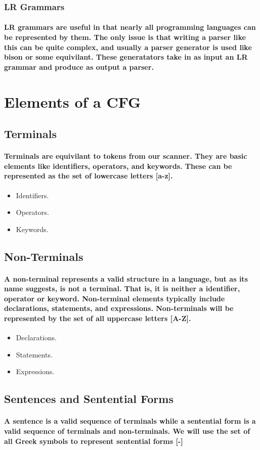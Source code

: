 \documentclass{article}
\begin{document}
\subsubsection{LR Grammars}
\paragraph{
    LR grammars are useful in that nearly all programming languages can be 
    represented by them. The only issue is that writing a parser like this 
    can be quite complex, and usually a parser generator is used like bison
    or some equivilant. These generatators take in as input an LR grammar
    and produce as output a parser.
}


\section{Elements of a CFG}
\subsection{Terminals}
\paragraph{
    Terminals are equivilant to tokens from our scanner. They are basic 
    elements like identifiers, operators, and keywords. These can be
    represented as the set of lowercase letters [a-z].
}
\begin{itemize}
    \item Identifiers.
    \item Operators.
    \item Keywords.
\end{itemize}
\subsection{Non-Terminals}
\paragraph{
    A non-terminal represents a valid structure in a language, but as its name
    suggests, is not a terminal. That is, it is neither a identifier,
    operator or keyword. Non-terminal elements typically include declarations,
    statements, and expressions. Non-terminals will be represented by the set
    of all uppercase letters [A-Z].
}
\begin{itemize}
    \item Declarations.
    \item Statements.
    \item Expressions.
\end{itemize}
\subsection{Sentences and Sentential Forms}
\paragraph{
    A sentence is a valid sequence of terminals while a sentential form is a
    valid sequence of terminals and non-terminals. We will use the set of all
    Greek symbols to represent sentential forms [\alpha-\Omega]
}
\end{document}
